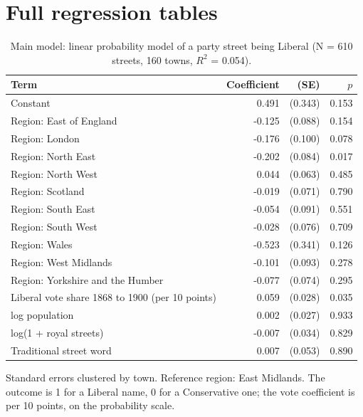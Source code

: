 \documentclass[11pt,a4paper]{article}
\begin{document}
\section{Full regression tables}
\begin{table}[tbp]\centering\footnotesize\begin{threeparttable}\caption{Main model: linear probability model of a party street being Liberal (N = 610 streets, 160 towns, $R^2$ = 0.054).}\label{tab:main}\begin{tabular}{p{7.5cm}rrr}\toprule Term & Coefficient & (SE) & $p$\\\midrule
Constant & 0.491 & (0.343) & 0.153\\
Region: East of England & -0.125 & (0.088) & 0.154\\
Region: London & -0.176 & (0.100) & 0.078\\
Region: North East & -0.202 & (0.084) & 0.017\\
Region: North West & 0.044 & (0.063) & 0.485\\
Region: Scotland & -0.019 & (0.071) & 0.790\\
Region: South East & -0.054 & (0.091) & 0.551\\
Region: South West & -0.028 & (0.076) & 0.709\\
Region: Wales & -0.523 & (0.341) & 0.126\\
Region: West Midlands & -0.101 & (0.093) & 0.278\\
Region: Yorkshire and the Humber & -0.077 & (0.074) & 0.295\\
Liberal vote share 1868 to 1900 (per 10 points) & 0.059 & (0.028) & 0.035\\
log population & 0.002 & (0.027) & 0.933\\
log(1 + royal streets) & -0.007 & (0.034) & 0.829\\
Traditional street word & 0.007 & (0.053) & 0.890\\
\bottomrule\end{tabular}\begin{tablenotes}\footnotesize\item Standard errors clustered by town. Reference region: East Midlands. The outcome is 1 for a Liberal name, 0 for a Conservative one; the vote coefficient is per 10 points, on the probability scale.\end{tablenotes}\end{threeparttable}\end{table}
\end{document}
